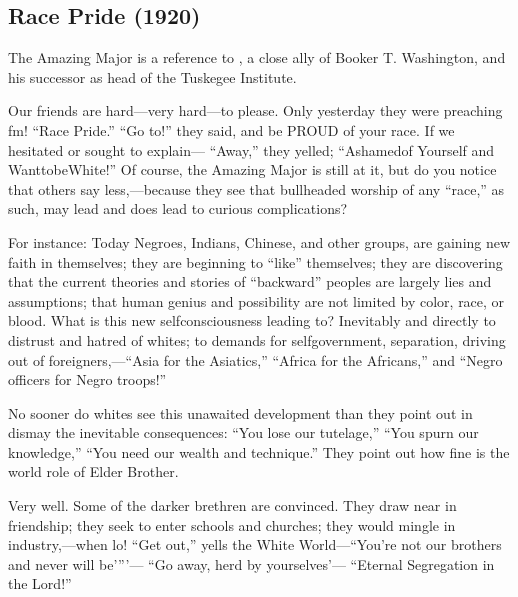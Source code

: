 \documentclass[letterpaper,10pt,english]{jupyterBook}
\begin{document}
\subsection{Race Pride (1920)}
\label{\detokenize{Volumes/19/03/race_pride:race-pride-1920}}\label{\detokenize{Volumes/19/03/race_pride::doc}}
\begin{sphinxShadowBox}
\sphinxstylesidebartitle{}

\sphinxAtStartPar
The Amazing Major is a reference to , a close ally of Booker T. Washington, and his successor as head of the  Tuskegee Institute.
\end{sphinxShadowBox}

\sphinxAtStartPar
Our friends are hard—very hard—to please. Only yesterday they were preaching fm! “Race Pride.” “Go to!” they said, and be PROUD of your race. If we hesitated or sought to explain— “Away,” they yelled; “Ashamed\sphinxhyphen{}of Yourself and Want\sphinxhyphen{}to\sphinxhyphen{}be\sphinxhyphen{}White!” Of course, the Amazing Major is still at it, but do you notice that others say less,—because they see that bullheaded worship of any “race,” as such, may lead and does lead to curious complications?

\sphinxAtStartPar
For instance: Today Negroes, Indians, Chinese, and other groups, are gaining new faith in themselves; they are beginning to “like” themselves; they are discovering that the current theories and stories of “backward” peoples are largely lies and assumptions; that human genius and possibility are not limited by color, race, or blood. What is this new self\sphinxhyphen{}consciousness leading to? Inevitably and directly to distrust and hatred of whites; to demands for self\sphinxhyphen{}government, separation, driving out of foreigners,—“Asia for the Asiatics,” “Africa for the Africans,” and “Negro officers for Negro troops!”

\sphinxAtStartPar
No sooner do whites see this unawaited development than they point out in dismay the inevitable consequences: “You lose our tutelage,” “You spurn our knowledge,” “You need our wealth and technique.” They point out how fine is the world role of Elder Brother.

\sphinxAtStartPar
Very well. Some of the darker brethren are convinced. They draw near in friendship; they seek to enter schools and churches; they would mingle in industry,—when lo! “Get out,” yells the White World—“You’re not our brothers and never will be’”’— “Go away, herd by yourselves’— “Eternal Segregation in the Lord!”
\end{document}
